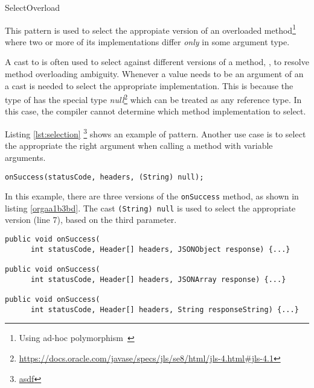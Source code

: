 
\begin{pattern}{SelectOverload}

This pattern is used to select the appropiate version of an overloaded
method\footnote{Using ad-hoc polymorphism~\cite{stracheyFundamentalConceptsProgramming2000}}
where two or more of its implementations differ \emph{only} in some argument type.

A cast to  is often used to select against different versions of a method,
\ie{}, to resolve method overloading ambiguity.
Whenever a  value needs to be an argument of an a cast is needed to select
the appropriate implementation.
This is because the type of  has the special type
\emph{null}\footnote{\url{https://docs.oracle.com/javase/specs/jls/se8/html/jls-4.html\#jls-4.1}}
which can be treated as any reference type.
In this case, the compiler cannot determine which method implementation to select.

\instances

Listing \ref{lst:selection} \footnote{\url{asdf}}
shows an example of \pname{} pattern.
Another use case is to select the appropriate the right argument when calling a method with variable arguments.

\begin{lstlisting}[style=ql,label=lst:selection,caption=Example of \pname{} pattern.]
onSuccess(statusCode, headers, (String) null);
\end{lstlisting}

In this example, there are three versions of the \texttt{onSuccess} method, as shown in listing \ref{orgaa1b3bd}.
The cast \texttt{(String) null} is used to select the appropriate version (line 7), based on the third parameter.

	\begin{lstlisting}
public void onSuccess(
      int statusCode, Header[] headers, JSONObject response) {...}

public void onSuccess(
      int statusCode, Header[] headers, JSONArray response) {...}

public void onSuccess(
      int statusCode, Header[] headers, String responseString) {...}
\end{lstlisting}


\end{pattern}
